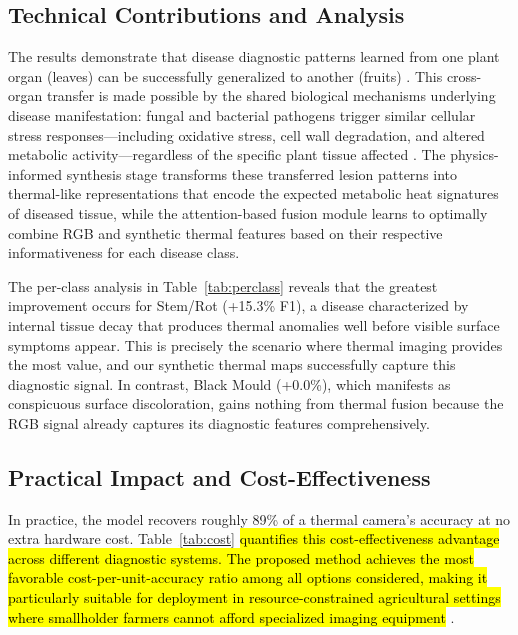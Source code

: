 \documentclass[utf8]{FrontiersinHarvard}
\newenvironment{revblock}{}{}
\begin{document}
\subsection{Technical Contributions and Analysis}
\begin{revblock}
The results demonstrate that disease diagnostic patterns learned from one plant organ (leaves) can be successfully generalized to another (fruits) \cite{hassan2021,bock2010}. This cross-organ transfer is made possible by the shared biological mechanisms underlying disease manifestation: fungal and bacterial pathogens trigger similar cellular stress responses---including oxidative stress, cell wall degradation, and altered metabolic activity---regardless of the specific plant tissue affected \cite{savary2019}. The physics-informed synthesis stage \cite{raissi2019,karniadakis2021} transforms these transferred lesion patterns into thermal-like representations that encode the expected metabolic heat signatures of diseased tissue, while the attention-based fusion module \cite{vaswani2017,guo2022} learns to optimally combine RGB and synthetic thermal features based on their respective informativeness for each disease class.

The per-class analysis in Table~\ref{tab:perclass} reveals that the greatest improvement occurs for Stem/Rot (+15.3\% F1), a disease characterized by internal tissue decay that produces thermal anomalies well before visible surface symptoms appear. This is precisely the scenario where thermal imaging provides the most value, and our synthetic thermal maps successfully capture this diagnostic signal. In contrast, Black Mould (+0.0\%), which manifests as conspicuous surface discoloration, gains nothing from thermal fusion because the RGB signal already captures its diagnostic features comprehensively.
\end{revblock}

\subsection{Practical Impact and Cost-Effectiveness}
In practice, the model recovers roughly 89\% of a thermal camera's accuracy at no extra hardware cost. Table~\ref{tab:cost} \hl{quantifies this cost-effectiveness advantage across different diagnostic systems. The proposed method achieves the most favorable cost-per-unit-accuracy ratio among all options considered, making it particularly suitable for deployment in resource-constrained agricultural settings where smallholder farmers cannot afford specialized imaging equipment} \cite{temniranrat2021,benos2021}.
\end{document}
